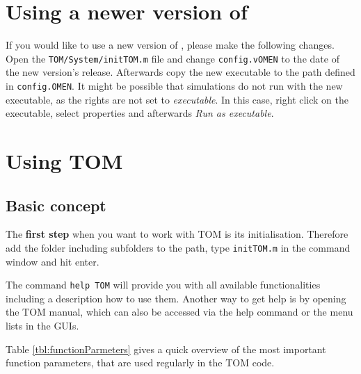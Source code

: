 	\section{Using a newer version of \omen}
		If you would like to use a new version of \omen, please make the following changes. Open the \lstinline{TOM/System/initTOM.m} file
		and change \lstinline{config.vOMEN} to the date of the new version's release. Afterwards copy the new \omen executable
		to the path defined in \lstinline{config.OMEN}.
		It might be possible that simulations do not run with the new executable, as the rights are not set to {\it executable}. In this case, right click on
		the executable, select properties and afterwards {\it Run as executable}. 
	
	
	\section{Using TOM}
		\subsection{Basic concept}
				The {\bf first step} when you want to work with \gls{TOM} is its initialisation. Therefore add the \software folder including subfolders to the \matlab path,
				type \lstinline{initTOM.m} in the command window and hit enter.
				
				The command \lstinline{help TOM} will provide you with all available functionalities including a description how to use them. Another way to
				get help is by opening the \gls{TOM} manual, which can also be accessed via the help command or the menu lists in the \glspl{GUI}.
				
				Table \ref{tbl:functionParmeters} gives a quick overview of the most important function parameters, that are used regularly in the \gls{TOM} code.
			
